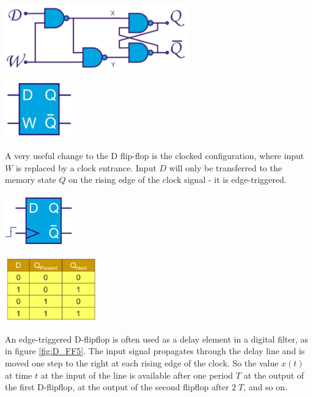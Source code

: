 \begin{minipage}{.5\textwidth}
	\centering
	\includegraphics[width=8cm]{figures/ch17/D_FF1.jpg}
	\label{fig:D_FF1}
\end{minipage}%
\begin{minipage}{.5\textwidth}
	\centering
	\includegraphics[width=3cm]{figures/ch17/D_FF2.jpg}
	\label{fig:D_FF2}
\end{minipage}

A very useful change to the D flip-flop is the clocked configuration, where input $W$ is replaced by a clock entrance. Input $D$ will only be transferred to the memory state $Q$ on the rising edge of the clock signal - it is edge-triggered.

\begin{minipage}{.5\textwidth}
	\centering
	\includegraphics[width=3cm]{figures/ch17/D_FF3.jpg}
	\label{fig:D_FF3}
\end{minipage}%
\begin{minipage}{.5\textwidth}
	\centering
	\includegraphics[width=4cm]{figures/ch17/D_FF4.jpg}
	\label{fig:D_FF4}
\end{minipage}

An edge-triggered D-flipflop is often used as a delay element in a digital filter, as in figure \ref{fig:D_FF5}. The input signal propagates through the delay line and is moved one step to the right at each rising edge of the clock. So the value $x(t)$ at time $t$ at the input of the line is available after one period $T$ at the output of the first D-flipflop, at the output of the second flipflop after $2\;T$, and so on.


